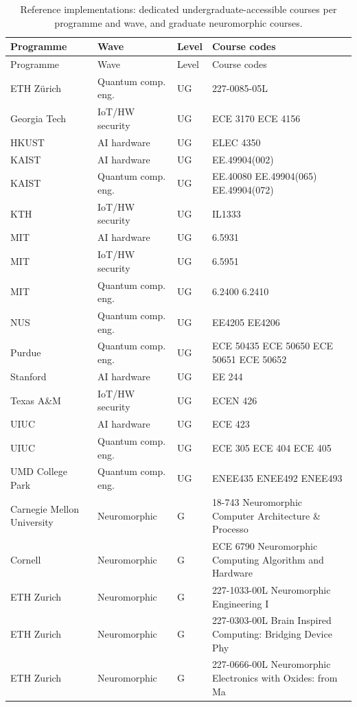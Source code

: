 \documentclass[10pt]{article}
\begin{document}
\begin{longtable}{@{}llll@{}}
\caption{Reference implementations: dedicated undergraduate-accessible courses per programme and wave, and graduate neuromorphic courses.}\label{tab:S10}\\
\toprule
Programme & Wave & Level & Course codes \\
\midrule
\endfirsthead
\toprule
Programme & Wave & Level & Course codes \\
\midrule
\endhead
\bottomrule
\endlastfoot
ETH Zürich & Quantum comp. eng. & UG & 227-0085-05L \\
Georgia Tech & IoT/HW security & UG & ECE 3170 ECE 4156 \\
HKUST & AI hardware & UG & ELEC 4350 \\
KAIST & AI hardware & UG & EE.49904(002) \\
KAIST & Quantum comp. eng. & UG & EE.40080 EE.49904(065) EE.49904(072) \\
KTH & IoT/HW security & UG & IL1333 \\
MIT & AI hardware & UG & 6.5931 \\
MIT & IoT/HW security & UG & 6.5951 \\
MIT & Quantum comp. eng. & UG & 6.2400 6.2410 \\
NUS & Quantum comp. eng. & UG & EE4205 EE4206 \\
Purdue & Quantum comp. eng. & UG & ECE 50435 ECE 50650 ECE 50651 ECE 50652 \\
Stanford & AI hardware & UG & EE 244 \\
Texas A\&M & IoT/HW security & UG & ECEN 426 \\
UIUC & AI hardware & UG & ECE 423 \\
UIUC & Quantum comp. eng. & UG & ECE 305 ECE 404 ECE 405 \\
UMD College Park & Quantum comp. eng. & UG & ENEE435 ENEE492 ENEE493 \\
Carnegie Mellon University & Neuromorphic & G & 18-743 Neuromorphic Computer Architecture \& Processo \\
Cornell & Neuromorphic & G & ECE 6790 Neuromorphic Computing Algorithm and Hardware \\
ETH Zurich & Neuromorphic & G & 227-1033-00L Neuromorphic Engineering I \\
ETH Zurich & Neuromorphic & G & 227-0303-00L Brain Inspired Computing: Bridging Device Phy \\
ETH Zurich & Neuromorphic & G & 227-0666-00L Neuromorphic Electronics with Oxides: from Ma \\

\end{longtable}
\end{document}
